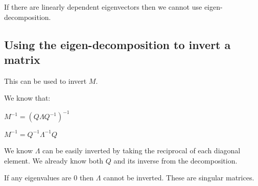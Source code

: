 If there are linearly dependent eigenvectors then we cannot use eigen-decomposition.

\subsection{Using the eigen-decomposition to invert a matrix}

This can be used to invert \(M\).

We know that:

\(M^{-1}=(Q\Lambda Q^{-1})^{-1}\)

\(M^{-1}=Q^{-1}\Lambda^{-1}Q\)

We know \(\Lambda \) can be easily inverted by taking the reciprocal of each diagonal element. We already know both \(Q\) and its inverse from the decomposition.

If any eigenvalues are \(0\) then \(\Lambda \) cannot be inverted. These are singular matrices.

